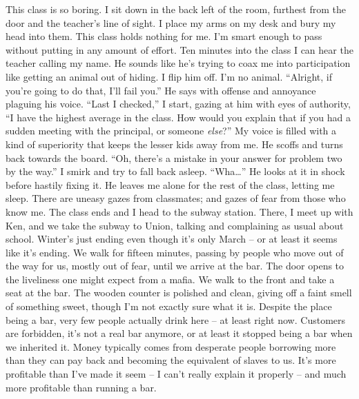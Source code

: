 \documentclass[a4paper, 12pt]{book}
\begin{document}
\newline\newline\newline
\tab
This class is so boring. I sit down in the back left of the room, furthest from the door and the teacher’s line of sight. I place my arms on my desk and bury my head into them. This class holds nothing for me. I’m smart enough to pass without putting in any amount of effort. Ten minutes into the class I can hear the teacher calling my name. He sounds like he’s trying to coax me into participation like getting an animal out of hiding. I flip him off. I’m no animal. 
\newline
\tab
``Alright, if you’re going to do that, I’ll fail you.''  He says with offense and annoyance plaguing his voice.
\newline
\tab
``Last I checked,'' I start, gazing at him with eyes of authority, ``I have the highest average in the class. How would you explain that if you had a sudden meeting with the principal, or someone \textit{else}?'' My voice is filled with a kind of superiority that keeps the lesser kids away from me. He scoffs and turns back towards the board. ``Oh, there’s a mistake in your answer for problem two by the way.'' I smirk and try to fall back asleep.
\newline
\tab
``Wha…'' He looks at it in shock before hastily fixing it. He leaves me alone for the rest of the class, letting me sleep. There are uneasy gazes from classmates; and gazes of fear from those who know me.
\newline
\tab
The class ends and I head to the subway station. There, I meet up with Ken, and we take the subway to Union, talking and complaining as usual about school. Winter’s just ending even though it’s only March -- or at least it seems like it’s ending. We walk for fifteen minutes, passing by people who move out of the way for us, mostly out of fear, until we arrive at the bar.
\newline
\tab
The door opens to the liveliness one might expect from a mafia. We walk to the front and take a seat at the bar. The wooden counter is polished and clean, giving off a faint smell of something sweet, though I’m not exactly sure what it is. Despite the place being a bar, very few people actually drink here -- at least right now. Customers are forbidden, it’s not a real bar anymore, or at least it stopped being a bar when we inherited it. Money typically comes from desperate people borrowing more than they can pay back and becoming the equivalent of slaves to us. It’s more profitable than I’ve made it seem -- I can’t really explain it properly -- and much more profitable than running a bar.
\end{document}
